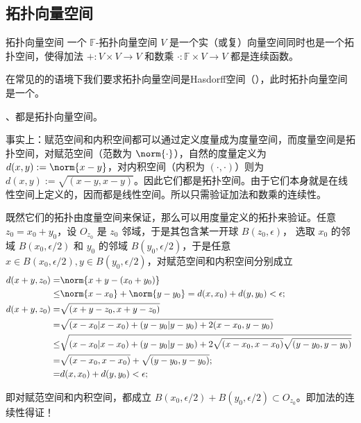 
\subsection{拓扑向量空间}

\begin{definition}{拓扑向量空间}
一个 $\mathbb{F}$-拓扑向量空间 $V$ 是一个实（或复）向量空间同时也是一个拓扑空间，使得加法 $+: V \times V \to V$ 和数乘 $\cdot: \mathbb{F} \times V \to V$ 都是连续函数。

在常见的的语境下我们要求拓扑向量空间是Hasdorff空间（），此时拓扑向量空间是一个。
\end{definition}

\begin{example}{}
、都是拓扑向量空间。

事实上：赋范空间和内积空间都可以通过定义度量成为度量空间，而度量空间是拓扑空间，对赋范空间（范数为 $\norm{\cdot}$），自然的度量定义为 $d(x,y):=\norm{x-y}$，对内积空间（内积为 $(\cdot,\cdot)$）则为 $d(x,y):=\sqrt{(x-y,x-y)}$。因此它们都是拓扑空间。由于它们本身就是在线性空间上定义的，因而都是线性空间。所以只需验证加法和数乘的连续性。

既然它们的拓扑由度量空间来保证，那么可以用度量定义的拓扑来验证。任意 $z_0=x_0+y_0$，设 $O_{z_0}$ 是 $z_0$ 邻域，于是其包含某一开球  $B(z_0,\epsilon)$， 选取 $x_0$ 的邻域 $B(x_0,\epsilon/2)$ 和 $y_0$ 的邻域 $B(y_0,\epsilon/2)$，于是任意 $x\in B(x_0,\epsilon/2),y\in B(y_0,\epsilon/2)$，对赋范空间和内积空间分别成立 
\begin{equation}
\begin{aligned}
d(x+y,z_0)=&\norm{x+y-(x_0+y_0)}\\
\leq& \norm{x-x_0}+\norm{y-y_0}=d(x,x_0)+d(y,y_0)< \epsilon;\\
d(x+y,z_0)=&\sqrt{(x+y-z_0,x+y-z_0)}\\
=&\sqrt{(x-x_0|x-x_0)+(y-y_0|y-y_0)+2(x-x_0,y-y_0)}\\
\leq&\sqrt{(x-x_0|x-x_0)+(y-y_0|y-y_0)+2\sqrt{(x-x_0,x-x_0)}\sqrt{(y-y_0,y-y_0)}}\\
=& \sqrt{(x-x_0,x-x_0)}+\sqrt{(y-y_0,y-y_0)};\\
=&d(x,x_0)+d(y,y_0)< \epsilon;\\
\end{aligned}~
\end{equation}
\end{example}
即对赋范空间和内积空间，都成立 $B(x_0,\epsilon/2)+B(y_0,\epsilon/2)\subset O_{z_0}$。即加法的连续性得证！

